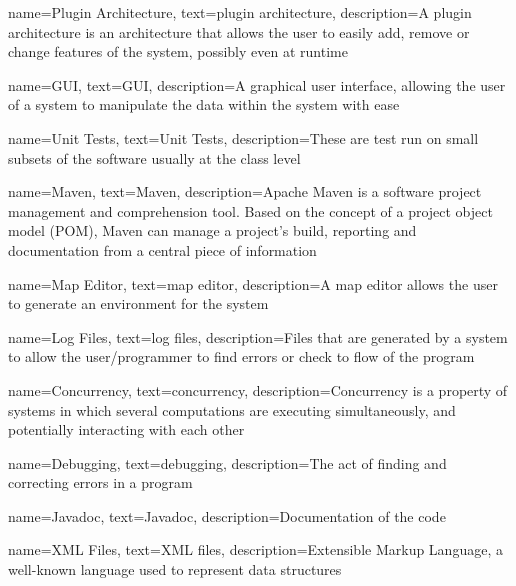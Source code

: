 {
    name={Plugin Architecture},
    text={plugin architecture},
    description={A plugin architecture is an architecture that allows the user to easily add, remove or change features of the system, possibly even at runtime}
}

{
    name={GUI},
    text={GUI},
    description={A graphical user interface, allowing the user of a system to manipulate the data within the system with ease}
}

{
    name={Unit Tests},
    text={Unit Tests},
    description={These are test run on small subsets of the software usually at the class level}
}

{
    name={Maven},
    text={Maven},
    description={Apache Maven is a software project management and comprehension tool. Based on the concept of a project object model (POM), Maven can manage a project's build, reporting and documentation from a central piece of information}
}

{
    name={Map Editor},
    text={map editor},
    description={A map editor allows the user to generate an environment for the system}
}

{
    name={Log Files},
    text={log files},
    description={Files that are generated by a system to allow the user/programmer to find errors or check to flow of the program}
}

{
    name={Concurrency},
    text={concurrency},
    description={Concurrency is a property of systems in which several computations are executing simultaneously, and potentially interacting with each other}
}

{
    name={Debugging},
    text={debugging},
    description={The act of finding and correcting errors in a program}
}

{
    name={Javadoc},
    text={Javadoc},
    description={Documentation of the code}
}

{
    name={XML Files},
    text={XML files},
    description={Extensible Markup Language, a well-known language used to represent data structures}
}